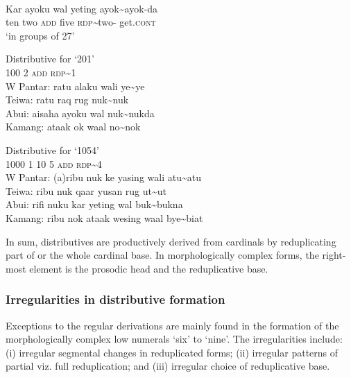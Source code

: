 \documentclass[output=paper]{LSP/langsci}
\begin{document}
\ea%
\label{bkm:Ref342661452}
\\
\gll Kar   ayoku   wal   yeting   ayok\~{}ayok-da\\  
   ten   two   \textsc{add}   five   \textsc{rdp}\textit{\~{}}two-\textsc{} get.\textsc{cont} \\
\glt  `in groups of 27' 
\z
 


\ea%
\label{bkm:Ref342656299}
 
 Distributive for `201' \\
\glllll  {} 100    2    \textsc{add}    \textsc{rdp}\~{}1\\  
 {W Pantar:} ratu    alaku    wali     ye\~{}ye        \\
 Teiwa:    ratu    raq    rug    nuk\~{}nuk      \\
 Abui:     aisaha     ayoku    wal    nuk\~{}nukda      \\
 Kamang:   ataak     ok     waal    no\~{}nok     \\  
\z


    

 
 
 
 

\ea%
\label{bkm:Ref342744393}
 
 Distributive for `1054'\\
\glllll   {}   1000    1  10  5    \textsc{add}  \textsc{rdp}\~{}4 \\      
   {W Pantar:}  (a)ribu   nuk   ke  yasing     wali  atu\~{}atu    \\
   Teiwa:    ribu     nuk  qaar  yusan    rug  ut\~{}ut    \\
   Abui:     rifi    nuku  kar  yeting    wal  buk\~{}bukna      \\
   Kamang:   ribu    nok  ataak  wesing    waal  bye\~{}biat     \\
\z


In sum, distributives are productively derived from cardinals by reduplicating part of or the whole cardinal base. In morphologically complex forms, the right-most element is the prosodic head and the reduplicative base. 

\subsubsection{Irregularities in distributive formation}
\label{sec:8:Irregularities}
Exceptions to the regular derivations are mainly found in the formation of the morphologically complex low numerals `six' to `nine'. The irregularities include: (i) irregular segmental changes in reduplicated forms; (ii) irregular patterns of partial viz. full reduplication; and (iii) irregular choice of reduplicative base. 
\end{document}
